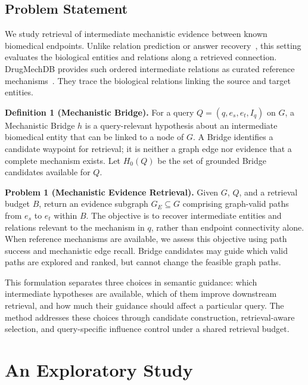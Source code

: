 \documentclass{article} %
\begin{document}
\subsection{Problem Statement}
\label{sec:problem_statement}

We study retrieval of intermediate mechanistic evidence between known biomedical endpoints. Unlike relation prediction or answer recovery~\citep{das2018minerva,lin2018multihop,sun2019pullnet}, this setting evaluates the biological entities and relations along a retrieved connection. DrugMechDB provides such ordered intermediate relations as curated reference mechanisms~\citep{gonzalez2023drugmechdb}. They trace the biological relations linking the source and target entities.

\noindent\textbf{Definition 1 (Mechanistic Bridge).} For a query $Q=(q,e_s,e_t,I_q)$ on $G$, a Mechanistic Bridge $h$ is a query-relevant hypothesis about an intermediate biomedical entity that can be linked to a node of $G$. A Bridge identifies a candidate waypoint for retrieval; it is neither a graph edge nor evidence that a complete mechanism exists. Let $H_0(Q)$ be the set of grounded Bridge candidates available for $Q$.

\noindent\textbf{Problem 1 (Mechanistic Evidence Retrieval).} Given $G$, $Q$, and a retrieval budget $B$, return an evidence subgraph $G_E\subseteq G$ comprising graph-valid paths from $e_s$ to $e_t$ within $B$. The objective is to recover intermediate entities and relations relevant to the mechanism in $q$, rather than endpoint connectivity alone. When reference mechanisms are available, we assess this objective using path success and mechanistic edge recall. Bridge candidates may guide which valid paths are explored and ranked, but cannot change the feasible graph paths.

This formulation separates three choices in semantic guidance: which intermediate hypotheses are available, which of them improve downstream retrieval, and how much their guidance should affect a particular query. The method addresses these choices through candidate construction, retrieval-aware selection, and query-specific influence control under a shared retrieval budget.
\section{An Exploratory Study}
\label{sec:exploratory}
\end{document}
